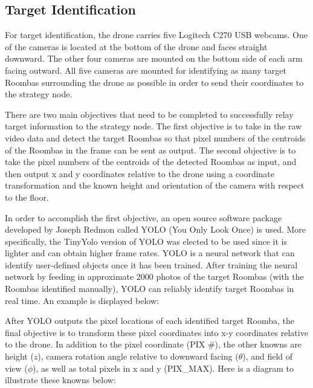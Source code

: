 \documentclass[12pt,letterpaper]{article}
\begin{document}
		\subsection*{Target Identification}
			For target identification, the drone carries five Logitech C270 USB webcams. One of the cameras is located at the bottom of the drone and faces straight downward. The other four cameras are mounted on the bottom side of each arm facing outward. All five cameras are mounted for identifying as many target Roombas surrounding the drone as possible in order to send their coordinates to the strategy node.

			There are two main objectives that need to be completed to successfully relay target information to the strategy node. The first objective is to take in the raw video data and detect the target Roombas so that pixel numbers of the centroids of the Roombas in the frame can be sent as output. The second objective is to take the pixel numbers of the centroids of the detected Roombas as input, and then output x and y coordinates relative to the drone using a coordinate transformation and the known height and orientation of the camera with respect to the floor.

			In order to accomplish the first objective, an open source software package developed by Joseph Redmon called YOLO (You Only Look Once) is used. More specifically, the TinyYolo version of YOLO was elected to be used since it is lighter and can obtain higher frame rates. YOLO is a neural network that can identify user-defined objects once it has been trained. After training the neural network by feeding in approximate 2000 photos of the target Roombas (with the Roombas identified manually), YOLO can reliably identify target Roombas in real time. An example is displayed below:


			After YOLO outputs the pixel locations of each identified target Roomba, the final objective is to transform these pixel coordinates into x-y coordinates relative to the drone. In addition to the pixel coordinate (PIX \#), the other knowns are height ($z$), camera rotation angle relative to downward facing ($\theta$), and field of view ($\phi$), as well as total pixels in x and y (PIX\_MAX).  Here is a diagram to illustrate these knowns below:
\end{document}
